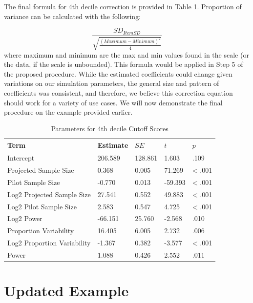\documentclass[
  man]{apa7}
\begin{document}
The final formula for 4th decile correction is provided in Table \ref{tab:table-decile}. Proportion of variance can be calculated with the following:

\[\frac{SD_{Item SD}}{\sqrt{\frac{(Maximum - Minimum)^2}{4}}}\] where maximum and minimum are the max and min values found in the scale (or the data, if the scale is unbounded). This formula would be applied in Step 5 of the proposed procedure. While the estimated coefficients could change given variations on our simulation parameters, the general size and pattern of coefficients was consistent, and therefore, we believe this correction equation should work for a variety of use cases. We will now demonstrate the final procedure on the example provided earlier.

\begin{table}[tbp]

\begin{center}
\begin{threeparttable}

\caption{\label{tab:table-decile}Parameters for 4th decile Cutoff Scores}

\begin{tabular}{lllll}
\toprule
Term & Estimate & $SE$ & $t$ & $p$\\
\midrule
Intercept & 206.589 & 128.861 & 1.603 & .109\\
Projected Sample Size & 0.368 & 0.005 & 71.269 & < .001\\
Pilot Sample Size & -0.770 & 0.013 & -59.393 & < .001\\
Log2 Projected Sample Size & 27.541 & 0.552 & 49.883 & < .001\\
Log2 Pilot Sample Size & 2.583 & 0.547 & 4.725 & < .001\\
Log2 Power & -66.151 & 25.760 & -2.568 & .010\\
Proportion Variability & 16.405 & 6.005 & 2.732 & .006\\
Log2 Proportion Variability & -1.367 & 0.382 & -3.577 & < .001\\
Power & 1.088 & 0.426 & 2.552 & .011\\
\bottomrule
\end{tabular}

\end{threeparttable}
\end{center}

\end{table}

\section{Updated Example}\label{updated-example}
\end{document}
